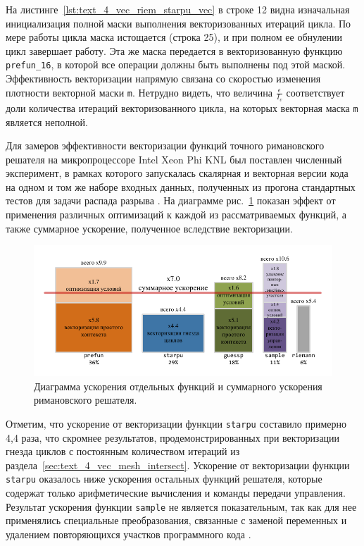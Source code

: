 На листинге~\ref{lst:text_4_vec_riem_starpu_vec} в строке 12 видна изначальная инициализация полной маски выполнения векторизованных итераций цикла.
По мере работы цикла маска истощается (строка 25), и при полном ее обнулении цикл завершает работу.
Эта же маска передается в векторизованную функцию \texttt{prefun\_16}, в которой все операции должны быть выполнены под этой маской.
Эффективность векторизации напрямую связана со скоростью изменения плотности векторной маски \texttt{m}.
Нетрудно видеть, что величина $\frac{\epsilon}{I_v}$ соответствует доли количества итераций векторизованного цикла, на которых векторная маска \texttt{m} является неполной.

Для замеров эффективности векторизации функций точного римановского решателя на микропроцессоре Intel Xeon Phi KNL\label{abbr:knl-10-2} был поставлен численный эксперимент, в рамках которого запускалась скалярная и векторная версии кода на одном и том же наборе входных данных, полученных из прогона стандартных тестов для задачи распада разрыва \cite{Bulat2015VecRiemann}.
На диаграмме рис.~\ref{fig:text_4_vec_riemann_perf} показан эффект от применения различных оптимизаций к каждой из рассматриваемых функций, а также суммарное ускорение, полученное вследствие векторизации.

\begin{figure}
\centering
\includegraphics[width=1.0\textwidth]{fig/vec_riemann_perf.pdf}
\singlespacing
{}\caption{Диаграмма ускорения отдельных функций и суммарного ускорения римановского решателя.}
\label{fig:text_4_vec_riemann_perf}
\end{figure}

Отметим, что ускорение от векторизации функции \texttt{starpu} составило примерно 4,4 раза, что скромнее результатов, продемонстрированных при векторизации гнезда циклов с постоянным количеством итераций из раздела~\ref{sec:text_4_vec_mesh_intersect}.
Ускорение от векторизации функции \texttt{starpu} оказалось ниже ускорения остальных функций решателя, которые содержат только арифметические вычисления и команды передачи управления.
Результат ускорения функции \texttt{sample} не является показательным, так как для нее применялись специальные преобразования, связанные с заменой переменных и удалением повторяющихся участков программного кода \cite{Rybakov2018VecBranch}.

